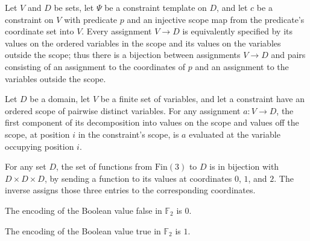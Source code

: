 \begin{definition}
\label{FABL.cspScopeSplitEquiv}
\leanok
{}
Let $V$ and $D$ be sets, let $\Psi$ be a constraint template on $D$, and let $c$ be a
constraint on $V$ with predicate $p$ and an injective scope map from the predicate’s
coordinate set into $V$. Every assignment $V\to D$ is equivalently specified by its
values on the ordered variables in the scope and its values on the variables outside the
scope; thus there is a bijection between assignments $V\to D$ and pairs consisting of an
assignment to the coordinates of $p$ and an assignment to the variables outside the
scope.
\end{definition}

\begin{theorem}
\label{FABL.cspScopeSplitEquiv_fst_apply}
\leanok
{}
Let $D$ be a domain, let $V$ be a finite set of variables, and let a constraint have an
ordered scope of pairwise distinct variables. For any assignment $a:V\to D$, the first
component of its decomposition into values on the scope and values off the scope, at
position $i$ in the constraint's scope, is $a$ evaluated at the variable occupying
position $i$.
\end{theorem}

\begin{definition}
\label{FABL.finThreeArrowEquiv}
\leanok
For any set $D$, the set of functions from $\mathrm{Fin}(3)$ to $D$ is in bijection with
$D\times D\times D$, by sending a function to its values at coordinates $0$, $1$, and
$2$. The inverse assigns those three entries to the corresponding coordinates.
\end{definition}

\begin{theorem}
\leanok
{}
The encoding of the Boolean value false in $\mathbb{F}_2$ is $0$.
\end{theorem}

\begin{theorem}
\leanok
{}
The encoding of the Boolean value true in $\mathbb{F}_2$ is $1$.
\end{theorem}

